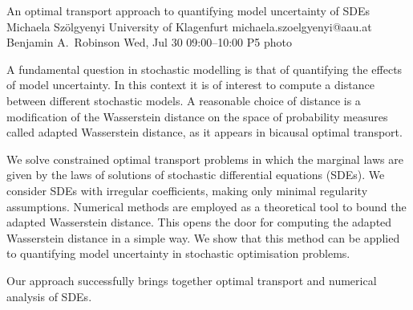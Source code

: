 \clearpage
\begin{talk}
  {An optimal transport approach to quantifying model uncertainty of SDEs}%
  {Michaela Sz\"olgyenyi}%
  {University of Klagenfurt}%
  {michaela.szoelgyenyi@aau.at}%
  {Benjamin A.~Robinson}%
  {}%
  {Wed, Jul 30 09:00–10:00}%
  {P5}%
  {photo}%
  
				
			
A fundamental question in stochastic modelling is that of quantifying the effects of model uncertainty. In this context it is of interest to compute a distance between different stochastic models. A  reasonable choice of distance is a modification of the Wasserstein distance on the space of probability measures called adapted Wasserstein distance, as it appears in bicausal optimal transport.

	We solve constrained optimal transport problems in which the marginal laws are given by the laws of solutions of stochastic differential equations (SDEs). We consider SDEs with irregular coefficients, making only minimal regularity assumptions. Numerical methods are employed as a theoretical tool to bound the adapted Wasserstein distance. This opens the door for computing the adapted Wasserstein distance in a simple way. We show that this method can be applied to quantifying model uncertainty in stochastic optimisation problems. 	
	
	Our approach successfully brings together optimal transport and numerical analysis of SDEs. 
\end{talk}

